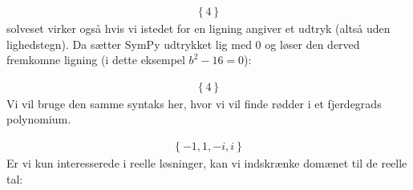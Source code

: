 \documentclass[letterpaper,10pt,english]{jupyterBook}
\begin{document}
\begin{sphinxVerbatim}[commandchars=\\\{\}]
              
     
\end{sphinxVerbatim}
\begin{equation*}
\begin{split}\displaystyle \left\{4\right\}\end{split}
\end{equation*}
solveset virker også hvis vi istedet for en ligning angiver et udtryk (altså uden lighedstegn). Da sætter SymPy udtrykket lig med 0 og løser den derved fremkomne ligning (i dette eksempel \(b^2-16 = 0\)):

\begin{sphinxVerbatim}[commandchars=\\\{\}]
       
\end{sphinxVerbatim}
\begin{equation*}
\begin{split}\displaystyle \left\{4\right\}\end{split}
\end{equation*}
Vi vil bruge den samme syntaks her, hvor vi vil finde rødder i et fjerdegrads polynomium.

\begin{sphinxVerbatim}[commandchars=\\\{\}]
   
      
    
\end{sphinxVerbatim}
\begin{equation*}
\begin{split}\displaystyle \left\{-1, 1, - i, i\right\}\end{split}
\end{equation*}
Er vi kun interesserede i reelle løsninger, kan vi indskrænke domænet til de reelle tal:
\end{document}

